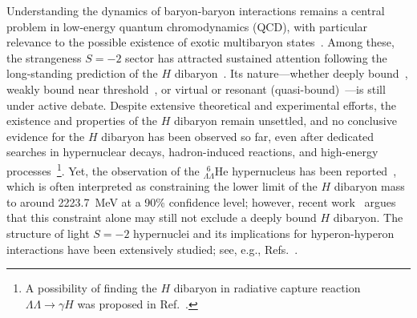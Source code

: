 \documentclass[prl,showpacs,twocolumn,superscriptaddress,floatfix,10pt,footinbib]{revtex4-2}
\begin{document}
Understanding the dynamics of baryon-baryon interactions remains a central problem in low-energy quantum chromodynamics (QCD), with particular relevance to the possible existence of exotic multibaryon states~\cite{Dyson:1964xwa, Locher:1985nu, Epelbaum:2008ga, Clement:2016vnl, Gal:2016boi}. Among these, the strangeness $S=-2$ sector has attracted sustained attention following the long-standing prediction of the $H$ dibaryon~\cite{Jaffe:1976yi}. Its nature---whether deeply bound~\cite{Jaffe:1976yi, Balachandran:1985fb, Yost:1985mj}, weakly bound near threshold~\cite{Straub:1988mz, Kodama:1994np, Nakamoto:1997gh, Shen:2000qs, NPLQCD:2010ocs, Inoue:2010es, Beane:2011zpa, NPLQCD:2011naw, Haidenbauer:2011ah, Haidenbauer:2011za, Inoue:2011ai, Francis:2018qch, Green:2021qol}, or virtual or resonant (quasi-bound)~\cite{Oka:1983ku, Beane:2011zpa, Shanahan:2011su, Haidenbauer:2011ah, Haidenbauer:2011za, Inoue:2011ai, Haidenbauer:2015zqb, Yamaguchi:2016kxa, HALQCD:2019wsz}---is still under active debate. Despite extensive theoretical and experimental efforts, the existence and properties of the $H$ dibaryon remain unsettled, and no conclusive evidence for the $H$ dibaryon has been observed so far, even after dedicated searches in hypernuclear decays, hadron-induced reactions, and high-energy processes~\cite{Iijima:1992pp, BNLE836:1997dwi, E885:2000ped, Takahashi:2001nm, Yoon:2007aq, Belle:2013sba}\footnote{A possibility of finding the $H$ dibaryon in radiative capture reaction $\Lambda\Lambda\to\gamma H$ was proposed in Ref.~\cite{Hikota:2015dba}.}. Yet, the observation of the $_{\Lambda\Lambda}^{~~6}$He hypernucleus has been reported~\cite{Takahashi:2001nm}, which is often interpreted as constraining the lower limit of the $H$ dibaryon mass to around 2223.7~MeV at a 90\% confidence level; however, recent work~\cite{Gal:2024nbr} argues that this constraint alone may still not exclude a deeply bound $H$ dibaryon. The structure of light $S=-2$ hypernuclei and its implications for hyperon-hyperon interactions have been extensively studied; see, e.g., Refs.~\cite{Hiyama:2004be, Contessi:2018qnz, Hiyama:2018lgs, Contessi:2019csf, Le:2021wwz, Le:2021gxa, Miwa:2025adw}.
\end{document}
